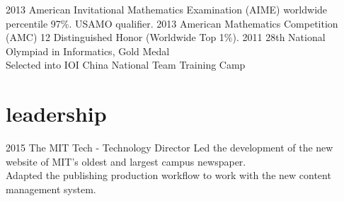 \documentclass[__VERSION__]{friggeri-cv} %
\begin{document}
\begin{entrylist}
  \centry
  {2013}
  {American Invitational Mathematics Examination (AIME) worldwide percentile 97\%. USAMO qualifier. }
  \centry
  {2013}
  {American Mathematics Competition (AMC) 12 Distinguished Honor (Worldwide Top 1\%). }
  \centry
  {2011}
  {28th National Olympiad in Informatics, Gold Medal \\
  Selected into IOI China National Team Training Camp}
\end{entrylist}



\section{leadership}

\begin{entrylist}
  \entry
  {2015}
  {The MIT Tech - Technology Director}
  {}
  {Led the development of the new website of MIT's oldest and largest campus newspaper. \\
  Adapted the publishing production workflow to work with the new content management system. }
\end{entrylist}
\end{document}
